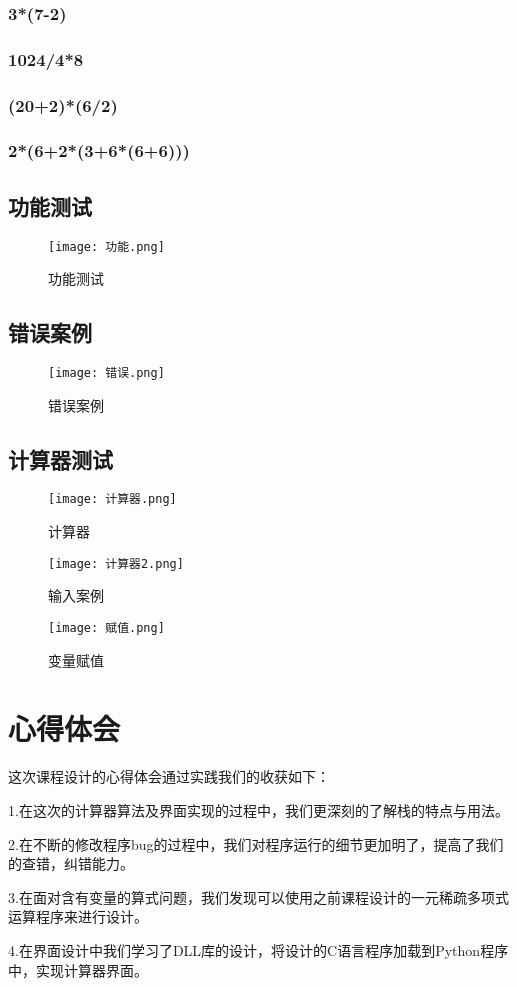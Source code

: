 \documentclass{DateStructure}
\begin{document}
\subsubsection{3*(7-2)}

\subsubsection{1024/4*8}

\subsubsection{(20+2)*(6/2)}

\subsubsection{2*(6+2*(3+6*(6+6)))}

\subsection{功能测试}
\begin{figure}[H] 
\centering
\texttt{[image: 功能.png]}
\caption{功能测试}
\end{figure}
\subsection{错误案例}
\begin{figure}[H] 
\centering
\texttt{[image: 错误.png]}
\caption{错误案例}
\end{figure}
\subsection{计算器测试}
\begin{figure}[H] 
\centering
\texttt{[image: 计算器.png]}
\caption{计算器}
\end{figure}
\begin{figure}[H] 
\centering
\texttt{[image: 计算器2.png]}
\caption{输入案例}
\end{figure}
\begin{figure}[H] 
\centering
\texttt{[image: 赋值.png]}
\caption{变量赋值}
\end{figure}

\section{心得体会}
这次课程设计的心得体会通过实践我们的收获如下：\par
1.在这次的计算器算法及界面实现的过程中，我们更深刻的了解栈的特点与用法。\par
2.在不断的修改程序bug的过程中，我们对程序运行的细节更加明了，提高了我们的查错，纠错能力。\par
3.在面对含有变量的算式问题，我们发现可以使用之前课程设计的一元稀疏多项式运算程序来进行设计。\par
4.在界面设计中我们学习了DLL库的设计，将设计的C语言程序加载到Python程序中，实现计算器界面。\par
\end{document}
